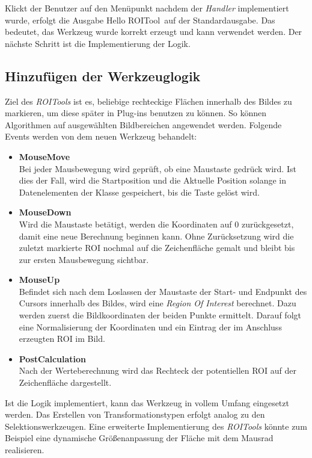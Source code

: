 Klickt der Benutzer auf den Menüpunkt nachdem der \textit{Handler} implementiert wurde, erfolgt die Ausgabe \glqq Hello ROITool\grqq\ auf der Standardausgabe. Das bedeutet, das Werkzeug wurde korrekt erzeugt und kann verwendet werden. Der nächste Schritt ist die Implementierung der Logik.

\subsection{Hinzufügen der Werkzeuglogik}

Ziel des \textit{ROITools} ist es, beliebige rechteckige Flächen innerhalb des Bildes zu markieren, um diese später in Plug-ins benutzen zu können. So können Algorithmen auf ausgewählten Bildbereichen angewendet werden. Folgende Events werden von dem neuen Werkzeug behandelt:

\begin{itemize}
\item \textbf{MouseMove} \\
Bei jeder Mausbewegung wird geprüft, ob eine Maustaste gedrück wird. Ist dies der Fall, wird die Startposition und die Aktuelle Position solange in Datenelementen der Klasse gespeichert, bis die Taste gelöst wird.
\item \textbf{MouseDown} \\
Wird die Maustaste betätigt, werden die Koordinaten auf $0$ zurückgesetzt, damit eine neue Berechnung beginnen kann. Ohne Zurücksetzung wird die zuletzt markierte ROI nochmal auf die Zeichenfläche gemalt und bleibt bis zur ersten Mausbewegung sichtbar.
\item \textbf{MouseUp} \\
 Befindet sich nach dem Loslassen der Maustaste der Start- und Endpunkt des Cursors innerhalb des Bildes, wird eine \textit{Region Of Interest} berechnet. Dazu werden zuerst die Bildkoordinaten der beiden Punkte ermittelt. Darauf folgt eine Normalisierung der Koordinaten und ein Eintrag der im Anschluss erzeugten ROI im Bild.

\pagebreak
\item \textbf{PostCalculation} \\
Nach der Werteberechnung wird das Rechteck der potentiellen ROI auf der Zeichenfläche dargestellt.
\end{itemize}


Ist die Logik implementiert, kann das Werkzeug in vollem Umfang eingesetzt werden. Das Erstellen von Transformationstypen erfolgt analog zu den Selektionswerkzeugen. Eine erweiterte Implementierung des \textit{ROITools} könnte zum Beispiel eine dynamische Größenanpassung der Fläche mit dem Mausrad realisieren.
